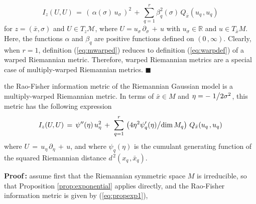 \documentclass{svmult}
\begin{document}
\begin{equation} \label{eq:mwarped}
  I_z(U,U) \,=\, \left(\,\!\alpha(\sigma) \, u_\sigma\,\!\right)^2 \,+\, \sum^r_{q=1}\beta^2_q(\sigma)\,Q_{\bar{x}}(u_{q\,},u_q) 
\end{equation}
for $z= (\bar{x},\sigma)$ and $U \in T_z\mathcal{M}$, where $U= u_\sigma\,\partial_\sigma\,+\,u$ with $u_\sigma \in \mathbb{R}$ and $u \in T_{\bar{x}}M$. Here, the functions $\alpha$ and $\beta_q$  are positive functions defined on $(0\,,\infty)$. Clearly, when $r = 1$, definition (\ref{eq:mwarped}) reduces to definition (\ref{eq:warpdef}) of a warped Riemannian metric. Therefore, warped Riemannian metrics are a special case of multiply-warped Riemannian metrics. \hfill$\blacksquare$ 
\begin{proposition} \label{prop:rgm}
 the Rao-Fisher information metric of the Riemannian Gaussian model is a multiply-warped Riemannian metric. In terms of $\bar{x} \in M$ and $\eta = -\left.1\middle/2\sigma^2\right.$, this metric has the following expression 
\begin{equation} \label{eq:proprgm1}
   I_z(U,U) \,=\,\psi^{\prime\prime}(\eta)\,u^2_\eta\,+\,\, \sum^r_{q=1}\,\left(4\eta^2\psi^\prime_q(\eta)\middle/\mathrm{dim}\,M_q\right)\,Q_{\bar{x}}(u_{q\,},u_q)
\end{equation}
where $U \,=\, u_\eta\,\partial_\eta\,+\,u$, and where $\psi_q(\eta)$ is the cumulant generating function of the squared Riemannian distance $d^{\,2}(x_{q\,},\bar{x}_q)$.
\end{proposition}
\vspace{0.1cm}
\textbf{Proof\,:} assume first that the Riemannian symmetric space $M$ is irreducible, so that Proposition \ref{prop:exponential} applies directly, and the Rao-Fisher information metric is given by (\ref{eq:propexp1}), 
\end{document}
